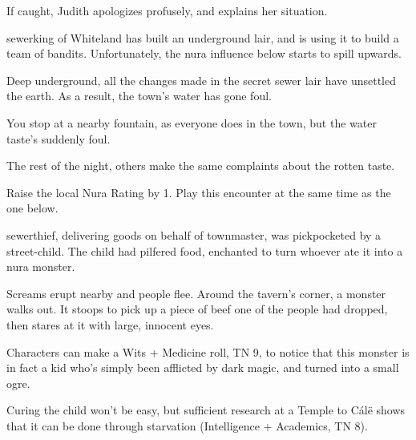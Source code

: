 \begin{multicols}{2}
If caught, Judith apologizes profusely, and explains her situation.



\stopcontents[sq]

\label{sewerbandits}

\startcontents[sq]

\sqminitoc

\Gls{sewerking} of Whiteland has built an underground lair, and is using it to build a team of bandits.
Unfortunately, the nura influence below starts to spill upwards.


Deep underground, all the changes made in the secret sewer lair have unsettled the earth.
As a result, the town's water has gone foul.

\begin{boxtext}

	You stop at a nearby fountain, as everyone does in the town, but the water taste's suddenly foul.

	The rest of the night, others make the same complaints about the rotten taste.

\end{boxtext}

Raise the local Nura Rating by 1.
Play this encounter at the same time as the one below.


\Gls{sewerthief}, delivering goods on behalf of \gls{townmaster}, was pickpocketed by a street-child.
The child had pilfered food, enchanted to turn whoever ate it into a nura monster.

\begin{boxtext}

	Screams erupt nearby and people flee.
	Around the tavern's corner, a monster walks out.
	It stoops to pick up a piece of beef one of the people had dropped, then stares at it with large, innocent eyes.

\end{boxtext}

Characters can make a Wits + Medicine roll, TN 9, to notice that this monster is in fact a kid who's simply been afflicted by dark magic, and turned into a small ogre.

Curing the child won't be easy, but sufficient research at a Temple to C\'{a}l\"{e} shows that it can be done through starvation (Intelligence + Academics, TN 8).


\end{multicols}
